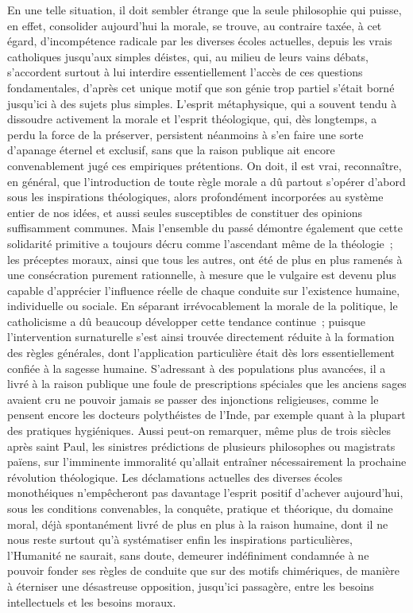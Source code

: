 \documentclass[french,twoside]{book} %
\begin{document}
En une telle situation, il doit sembler étrange que la seule philosophie qui puisse, en effet, consolider aujourd’hui la morale, se trouve, au contraire taxée, à cet égard, d’incompétence radicale par les diverses écoles actuelles, depuis les vrais catholiques jusqu’aux simples déistes, qui, au milieu de leurs vains débats, s’accordent surtout à lui interdire essentiellement l’accès de ces questions fondamentales, d’après cet unique motif que son génie trop partiel s’était borné jusqu’ici à des sujets plus simples. L’esprit métaphysique, qui a souvent tendu à dissoudre activement la morale et l’esprit théologique, qui, dès longtemps, a perdu la force de la préserver, persistent néanmoins à s’en faire une sorte d’apanage éternel et exclusif, sans que la raison publique ait encore convenablement jugé ces empiriques prétentions. On doit, il est vrai, reconnaître, en général, que l’introduction de toute règle morale a dû partout s’opérer d’abord sous les inspirations théologiques, alors profondément incorporées au système entier de nos idées, et aussi seules susceptibles de constituer des opinions suffisamment communes. Mais l’ensemble du passé démontre également que cette solidarité primitive a toujours décru comme l’ascendant même de la théologie ; les préceptes moraux, ainsi que tous les autres, ont été de plus en plus ramenés à une consécration purement rationnelle, à mesure que le vulgaire est devenu plus capable d’apprécier l’influence réelle de chaque conduite sur l’existence humaine, individuelle ou sociale. En séparant irrévocablement la morale de la politique, le catholicisme a dû beaucoup développer cette tendance continue ; puisque l’intervention surnaturelle s’est ainsi trouvée directement réduite à la formation des règles générales, dont l’application particulière était dès lors essentiellement confiée à la sagesse humaine. S’adressant à des populations plus avancées, il a livré à la raison publique une foule de prescriptions spéciales que les anciens sages avaient cru ne pouvoir jamais se passer des injonctions religieuses, comme le pensent encore les docteurs polythéistes de l’Inde, par exemple quant à la plupart des pratiques hygiéniques. Aussi peut-on remarquer, même plus de trois siècles après saint Paul, les sinistres prédictions de plusieurs philosophes ou magistrats païens, sur l’imminente immoralité qu’allait entraîner nécessairement la prochaine révolution théologique. Les déclamations actuelles des diverses écoles monothéiques n’empêcheront pas davantage l’esprit positif d’achever aujourd’hui, sous les conditions convenables, la conquête, pratique et théorique, du domaine moral, déjà spontanément livré de plus en plus à la raison humaine, dont il ne nous reste surtout qu’à systématiser enfin les inspirations particulières, l’Humanité ne saurait, sans doute, demeurer indéfiniment condamnée à ne pouvoir fonder ses règles de conduite que sur des motifs chimériques, de manière à éterniser une désastreuse opposition, jusqu’ici passagère, entre les besoins intellectuels et les besoins moraux.\par
\end{document}
